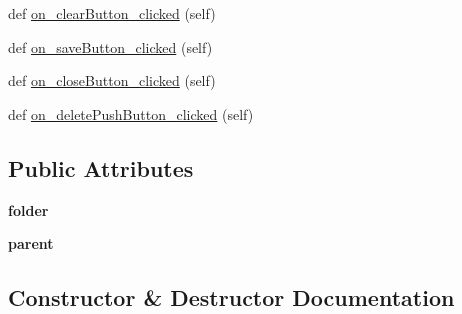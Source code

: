 \begin{DoxyCompactItemize}
\item 
def \mbox{\hyperlink{class_dsg_tools_1_1_user_tools_1_1profile__editor_1_1_profile_editor_a3090f6ec86d1c2c7c1016065b38de165}{on\+\_\+clear\+Button\+\_\+clicked}} (self)
\item 
def \mbox{\hyperlink{class_dsg_tools_1_1_user_tools_1_1profile__editor_1_1_profile_editor_aff1a716418372461a0d445d3482da1d8}{on\+\_\+save\+Button\+\_\+clicked}} (self)
\item 
def \mbox{\hyperlink{class_dsg_tools_1_1_user_tools_1_1profile__editor_1_1_profile_editor_a47e8c82f1e4a087aa55d4a66bcd089c1}{on\+\_\+close\+Button\+\_\+clicked}} (self)
\item 
def \mbox{\hyperlink{class_dsg_tools_1_1_user_tools_1_1profile__editor_1_1_profile_editor_a42cac187ac72a40e3e81c7ced772ff93}{on\+\_\+delete\+Push\+Button\+\_\+clicked}} (self)
\end{DoxyCompactItemize}
\subsection*{Public Attributes}
\begin{DoxyCompactItemize}
\item 
\mbox{\label{class_dsg_tools_1_1_user_tools_1_1profile__editor_1_1_profile_editor_a013b3c75123967e3c0467a478c63c617}} 
{\bfseries folder}
\item 
\mbox{\label{class_dsg_tools_1_1_user_tools_1_1profile__editor_1_1_profile_editor_ab0b6b47a5de817f8e6c37218866ede4b}} 
{\bfseries parent}
\end{DoxyCompactItemize}


\subsection{Constructor \& Destructor Documentation}
\mbox{\label{class_dsg_tools_1_1_user_tools_1_1profile__editor_1_1_profile_editor_a55f5ced4df1165a00e9a7e6124bae983}} 
